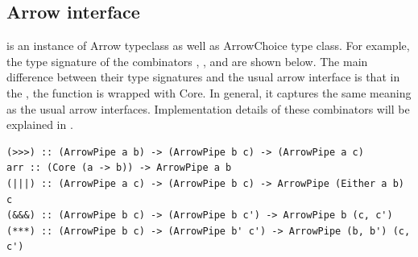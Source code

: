 \subsection{Arrow interface}
 is an instance of Arrow typeclass as well as ArrowChoice type class. For example, the type signature of the combinators \hask{>>>}, \hask{|||}, \hask{&&&} and  are shown below. The main difference between their type signatures and the usual arrow interface is that in the , the function is wrapped with Core. In general, it captures the same meaning as the usual arrow interfaces. Implementation details of these combinators will be explained in .
\begin{code}
\begin{verbatim}
(>>>) :: (ArrowPipe a b) -> (ArrowPipe b c) -> (ArrowPipe a c)
arr :: (Core (a -> b)) -> ArrowPipe a b
(|||) :: (ArrowPipe a c) -> (ArrowPipe b c) -> ArrowPipe (Either a b) c
(&&&) :: (ArrowPipe b c) -> (ArrowPipe b c') -> ArrowPipe b (c, c')
(***) :: (ArrowPipe b c) -> (ArrowPipe b' c') -> ArrowPipe (b, b') (c, c')
\end{verbatim}
\end{code} %
